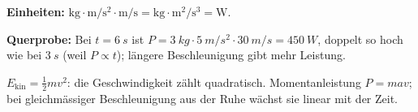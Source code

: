 \begin{kontrolle}
\textbf{Einheiten:} $\mathrm{kg\cdot m/s^2\cdot m/s}=\mathrm{kg\cdot m^2/s^3}
=\unit{\watt}$. \checkmark

\textbf{Querprobe:} Bei $t=\qty{6}{s}$ ist $P=\qty{3}{kg}\cdot\qty{5}{m/s^2}\cdot
\qty{30}{m/s}=\qty{450}{W}$, doppelt so hoch wie bei $\qty{3}{s}$ (weil $P\propto
t$); längere Beschleunigung gibt mehr Leistung. \checkmark
\end{kontrolle}

\begin{merksatz}
$E_{\mathrm{kin}}=\tfrac12mv^2$: die Geschwindigkeit zählt quadratisch.
Momentanleistung $P=mav$; bei gleichmässiger Beschleunigung aus der Ruhe
wächst sie linear mit der Zeit.
\end{merksatz}
